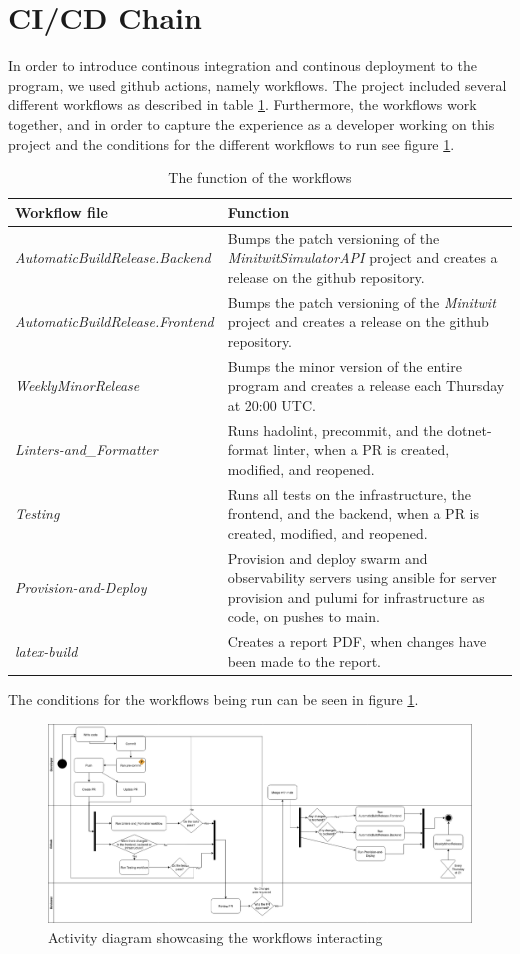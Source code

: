 \section{CI/CD Chain} %

In order to introduce continous integration and continous deployment to the program, we used github actions, namely workflows. The project included several different workflows as described in table \ref{tab:workflows}. Furthermore, the workflows work together, and in order to capture the experience as a developer working on this project and the conditions for the different workflows to run see figure \ref{fig:workflows}.

\begin{table}[]
    \centering
    \begin{tabular}{l|l}
        \textbf{Workflow file} & \textbf{Function}\\
        \hline
        \textit{AutomaticBuildRelease.Backend} &  Bumps the patch versioning of the \textit{MinitwitSimulatorAPI} project and creates a release on the github repository.\\
        \textit{AutomaticBuildRelease.Frontend} & Bumps the patch versioning of the \textit{Minitwit} project and creates a release on the github repository.\\
        \textit{WeeklyMinorRelease} & Bumps the minor version of the entire program and creates a release each Thursday at 20:00 UTC.\\
        \textit{Linters-and\_Formatter} & Runs hadolint, precommit, and the dotnet-format linter, when a PR is created, modified, and reopened.\\
        \textit{Testing} & Runs all tests on the infrastructure, the frontend, and the backend, when a PR is created, modified, and reopened.\\
        \textit{Provision-and-Deploy} & Provision and deploy swarm and observability servers using ansible for server provision and pulumi for infrastructure as code, on pushes to main.\\
        \textit{latex-build} & Creates a report PDF, when changes have been made to the report.
    \end{tabular}
    \caption{The function of the workflows}
    \label{tab:workflows}
\end{table}

The conditions for the workflows being run can be seen in figure \ref{fig:workflows}.

\begin{figure}
    \centering
    \includegraphics{report/images/Github-Actions.png}
    \caption{Activity diagram showcasing the workflows interacting }
    \label{fig:workflows}
\end{figure}

